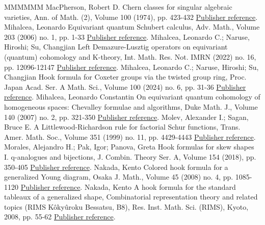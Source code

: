\documentclass[11pt]{article}
\theoremstyle{definition}
\numberwithin{equation}{section}
\begin{document}
\begin{thebibliography}{MMMMMM}
 MacPherson, Robert D. Chern classes for singular algebraic varieties, Ann. of Math. (2), Volume 100 (1974), pp. 423-432 \href{https://alco.centre-mersenne.org/articles/10.5802/alco.428/#macpherson:chern}{Publisher reference}.
 Mihalcea, Leonardo Equivariant quantum Schubert calculus, Adv. Math., Volume 203 (2006) no. 1, pp. 1-33 \href{https://alco.centre-mersenne.org/articles/10.5802/alco.428/#mihalcea:eqqgr}{Publisher reference}.
 Mihalcea, Leonardo C.; Naruse, Hiroshi; Su, Changjian Left Demazure-Lusztig operators on equivariant (quantum) cohomology and K-theory, Int. Math. Res. Not. IMRN (2022) no. 16, pp. 12096-12147 \href{https://alco.centre-mersenne.org/articles/10.5802/alco.428/#mihalcea2020left}{Publisher reference}.
 Mihalcea, Leonardo C.; Naruse, Hiroshi; Su, Changjian Hook formula for Coxeter groups via the twisted group ring, Proc. Japan Acad. Ser. A Math. Sci., Volume 100 (2024) no. 6, pp. 31-36 \href{https://alco.centre-mersenne.org/articles/10.5802/alco.428/#MNS24Coxeterhook}{Publisher reference}.
 Mihalcea, Leonardo Constantin On equivariant quantum cohomology of homogeneous spaces: Chevalley formulae and algorithms, Duke Math. J., Volume 140 (2007) no. 2, pp. 321-350 \href{https://alco.centre-mersenne.org/articles/10.5802/alco.428/#mihalcea:eqqhom}{Publisher reference}.
 Molev, Alexander I.; Sagan, Bruce E. A Littlewood-Richardson rule for factorial Schur functions, Trans. Amer. Math. Soc., Volume 351 (1999) no. 11, pp. 4429-4443 \href{https://alco.centre-mersenne.org/articles/10.5802/alco.428/#molev.sagan:Littlewood-Richardson}{Publisher reference}.
 Morales, Alejandro H.; Pak, Igor; Panova, Greta Hook formulas for skew shapes I. q-analogues and bijections, J. Combin. Theory Ser. A, Volume 154 (2018), pp. 350-405 \href{https://alco.centre-mersenne.org/articles/10.5802/alco.428/#morales.pak.panovaLhook}{Publisher reference}.
 Nakada, Kento Colored hook formula for a generalized Young diagram, Osaka J. Math., Volume 45 (2008) no. 4, pp. 1085-1120 \href{https://alco.centre-mersenne.org/articles/10.5802/alco.428/#nakada:colored}{Publisher reference}.
 Nakada, Kento A hook formula for the standard tableaux of a generalized shape, Combinatorial representation theory and related topics (RIMS Kôkyûroku Bessatsu, B8), Res. Inst. Math. Sci. (RIMS), Kyoto, 2008, pp. 55-62 \href{https://alco.centre-mersenne.org/articles/10.5802/alco.428/#nakada:proc}{Publisher reference}.

\end{thebibliography}
\end{document}
